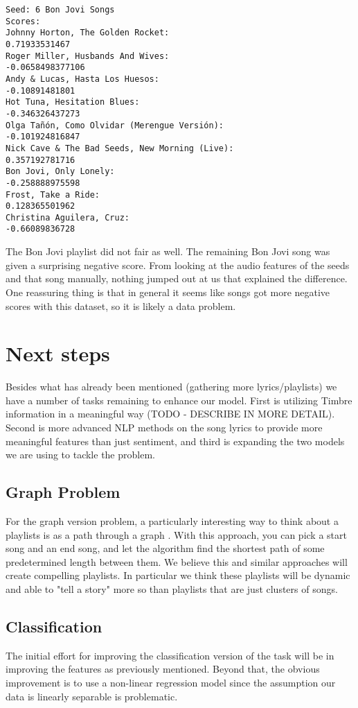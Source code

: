 \documentclass[10pt,journal,compsoc]{IEEEtran}
\begin{document}
\begin{lstlisting}
Seed: 6 Bon Jovi Songs
Scores:
Johnny Horton, The Golden Rocket:
0.71933531467
Roger Miller, Husbands And Wives:
-0.0658498377106
Andy & Lucas, Hasta Los Huesos:
-0.10891481801
Hot Tuna, Hesitation Blues:
-0.346326437273
Olga Tañón, Como Olvidar (Merengue Versión):
-0.101924816847
Nick Cave & The Bad Seeds, New Morning (Live):
0.357192781716
Bon Jovi, Only Lonely:
-0.258888975598
Frost, Take a Ride:
0.128365501962
Christina Aguilera, Cruz:
-0.66089836728
\end{lstlisting}
The Bon Jovi playlist did not fair as well. The remaining Bon Jovi song was given a surprising negative score. From looking at the audio features of the seeds and that song manually, nothing jumped out at us that explained the difference. One reassuring thing is that in general it seems like songs got more negative scores with this dataset, so it is likely a data problem.

\section{Next steps}
Besides what has already been mentioned (gathering more lyrics/playlists) we have a number of tasks remaining to enhance our model. First is utilizing Timbre information in a meaningful way (TODO - DESCRIBE IN MORE DETAIL). Second is more advanced NLP methods on the song lyrics to provide more meaningful features than just sentiment, and third is expanding the two models we are using to tackle the problem.

\subsection{Graph Problem}
For the graph version problem, a particularly interesting way to think about a playlists is as a path through a graph \cite{Alghoniemy01anetwork}. With this approach, you can pick a start song and an end song, and let the algorithm find the shortest path of some predetermined length between them. We believe this and similar approaches will create compelling playlists. In particular we think these playlists will be dynamic and able to "tell a story" more so than playlists that are just clusters of songs.

\subsection{Classification}
The initial effort for improving the classification version of the task will be in improving the features as previously mentioned. Beyond that, the obvious improvement is to use a non-linear regression model since the assumption our data is linearly separable is problematic.
\end{document}
